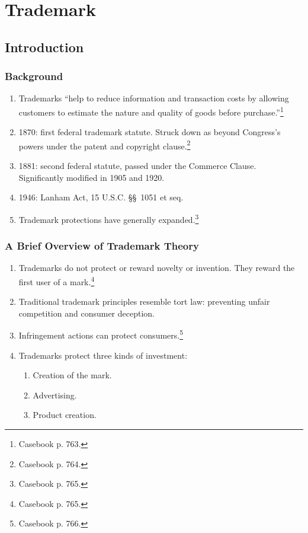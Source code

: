\section{Trademark}

\subsection{Introduction}

\subsubsection{Background}

\begin{enumerate}
    \item Trademarks ``help to reduce information and transaction costs by 
    allowing customers to estimate the nature and quality of goods before 
    purchase.''\footnote{Casebook p. 763.}
    \item 1870: first federal trademark statute. Struck down as beyond 
    Congress's powers under the patent and copyright clause.\footnote{Casebook 
    p. 764.}
    \item 1881: second federal statute, passed under the Commerce Clause. 
    Significantly modified in 1905 and 1920.
    \item 1946: Lanham Act, 15 U.S.C. \S\S\ 1051 et seq.
    \item Trademark protections have generally expanded.\footnote{Casebook p. 
    765.}
\end{enumerate}

\subsubsection{A Brief Overview of Trademark Theory}

\begin{enumerate}
    \item Trademarks do not protect or reward novelty or invention. They 
    reward the first user of a mark.\footnote{Casebook p. 765.}
    \item Traditional trademark principles resemble tort law: preventing 
    unfair competition and consumer deception.
    \item Infringement actions can protect consumers.\footnote{Casebook p. 
    766.}
    \item Trademarks protect three kinds of investment:
    \begin{enumerate}
        \item Creation of the mark.
        \item Advertising.
        \item Product creation.
    \end{enumerate}
\end{enumerate}

